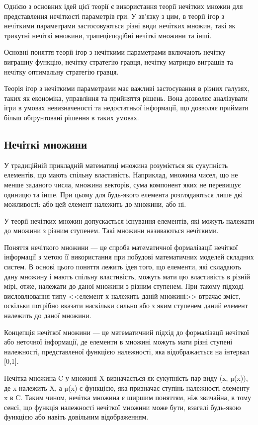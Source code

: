 \documentclass[14pt, a4paper, oneside]{extarticle}
\numberwithin{equation}{section}
\begin{document}
Однією з основних ідей цієї теорії є використання теорії нечітких множин для представлення нечіткості параметрів гри. У зв'язку з цим, в теорії ігор з нечіткими параметрами застосовуються різні види нечітких множин, такі як трикутні нечіткі множини, трапецієподібні нечіткі множини та інші.

Основні поняття теорії ігор з нечіткими параметрами включають нечітку виграшну функцію, нечітку стратегію гравця, нечітку матрицю виграшів та нечітку оптимальну стратегію гравця.

Теорія ігор з нечіткими параметрами має важливі застосування в різних галузях, таких як економіка, управління та прийняття рішень. Вона дозволяє аналізувати ігри в умовах невизначеності та недостатньої інформації, що дозволяє приймати більш обґрунтовані рішення в таких умовах.

\subsection{Нечіткі множини}

У традиційній прикладній математиці множина розуміється як сукупність елементів, що мають спільну властивість. Наприклад, множина чисел, що не менше заданого числа, множина векторів, сума компонент яких не перевищує одиницю та інше. При цьому для будь-якого елемента розглядаються лише дві можливості: або цей елемент належить до множини, або ні. \cite{Orl}

У теорії нечітких множин  допускається існування елементів, які можуть належати до множини з різним ступенем. Такі множини називаються нечіткими.

Поняття нечіткого множини — це спроба математичної формалізації нечіткої інформації з метою її використання при побудові математичних моделей складних систем. В основі цього поняття лежить ідея того, що елементи, які складають дану множину і мають спільну властивість, можуть мати цю властивість в різній мірі, отже, належати до даної множини з різним ступенем. При такому підході висловлювання типу <<елемент $х$ належить даній множині>> втрачає зміст, оскільки потрібно вказати наскільки сильно або з яким ступенем даний елемент належить до даної множини.

Концепція нечіткої множини — це математичний підхід до формалізації нечіткої або неточної інформації, де елементи в множині можуть мати різні ступені належності, представленої функцією належності, яка відображається на інтервал [0,1].

Нечітка множина C у множині X визначається як сукупність пар виду (x, µ(x)), де x належить X, а µ(x) є функцією, яка призначає ступінь належності елементу x в C. Таким чином, нечітка множина є ширшим поняттям, ніж звичайна, в тому сенсі, що функція належності нечіткої множини може бути, взагалі будь-якою функцією або навіть довільним відображенням.
\end{document}
